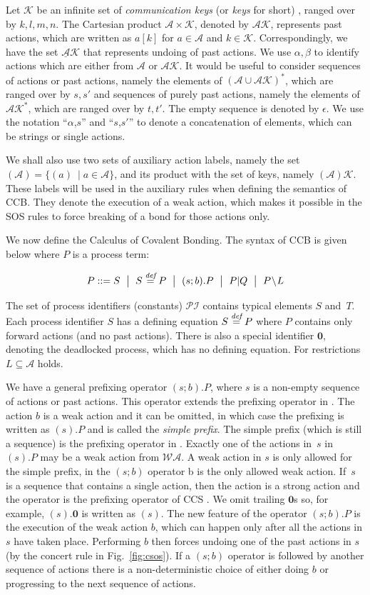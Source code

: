 \documentclass[runningheads]{llncs}
\newcommand{\restrict}[1]{\!\setminus\!#1}
\newcommand{\mA}{\mathcal{A}}
\newcommand{\mWA}{\mathcal{WA}}
\newcommand{\mAK}{\mathcal{AK}}
\newcommand{\umAK}{\underline{\mathcal{A}}\mathcal{K}}
\newcommand{\PI}{\mathcal{PI}}
\newcommand{\Nil}{\mathbf{0}}
\newcommand{\Keys}{\mathcal{K}}
\newcommand{\bydef}{\stackrel{\emph{def}}{=}}
\newcommand{\rulename}[1]{\textsf{#1}}
\begin{document}
Let $\Keys$ be an infinite set of {\em communication keys} (or {\em keys} for short)
\cite{Irek2007}, ranged over by $k,l, m,n$. The Cartesian product $\mathcal A \times \Keys$, denoted by $\mAK$,
 represents past actions, which are written as $a[k]$ for $a\in \mA$ and $k\in\Keys$. 
Correspondingly, we have the set $\umAK$ that represents undoing of past actions. We use $\alpha, \beta$ to identify actions which are either from $\mA$ or $\mAK$. It would be 
useful to consider sequences of actions or past actions, namely the elements of $(\mA \cup \mAK)^*$, 
which are ranged over by $s,s'$ and sequences of purely past actions, namely the elements of $\mAK^*$, 
which are ranged over by $t,t'$. The empty sequence is denoted by $\epsilon$. We use the notation ``$\alpha$,$s$'' and
``$s$,$s'$'' to denote a concatenation of elements, which can be strings or single actions.

We shall also use two sets of auxiliary action labels, namely the set $(\mA) =\{ (a)\ \mid a\in\mA\}$, and its product with the set of keys, namely $(\mA)\Keys$. These labels will be used in the auxiliary rules when defining
the semantics of CCB. They denote the execution of a weak action, which makes it possible in the SOS rules to force breaking of a bond for those actions only.

We now define the Calculus of Covalent Bonding. The syntax of CCB is given 
below where $P$ is a process term:

$$P ::=  S \ \bigm\lvert \ S\bydef P \ \bigm\lvert \ (s;b).P \ \bigm\lvert \ P\lvert Q \ \bigm\lvert \ P\restrict L $$

The set of process identifiers (constants) $\PI$ contains typical elements $S$ and~$T$. 
Each process identifier $S$ has a defining equation $S\bydef P$ where $P$ contains only forward 
actions (and no past actions). There is also a special identifier
 $\Nil$, denoting the deadlocked process, which has no defining equation. For restrictions $L \subseteq \mA$ holds.
 
We have a general prefixing operator
$(s;b).P$, where $s$ is a non-empty sequence of actions or past actions. This operator
extends the prefixing operator in \cite{Irek2012}. The action $b$ is a weak action
and it can be omitted, in which case the prefixing is written as $(s).P$ and is called the
\emph{simple prefix}. The simple prefix (which is still a sequence) is the prefixing operator in \cite{Irek2012}. 
Exactly one of the actions in~$s$ in $(s).P$ may be a weak action from $\mWA$. A weak action in $s$ is only allowed for the simple prefix, in the $(s;b)$ operator b is the only allowed weak action. If~$s$ is a sequence that contains   
a single action, then the action is a strong action and the operator 
is the prefixing operator of CCS \cite{MilnerBook}.
We omit trailing $\Nil$s so, for example, $(s).\Nil$ is written as $(s)$. The new feature of the operator $(s;b).P$ is the execution of the weak action $b$, which
can happen only after all the actions in $s$ have taken place. Performing $b$ then forces
undoing one of the past actions in $s$ (by the \rulename{concert} rule in Fig.~\ref{fig:csos}). If a $(s;b)$ operator is followed by another sequence of actions there is a non-deterministic choice of either doing $b$ or progressing to the next sequence of actions.
\end{document}
